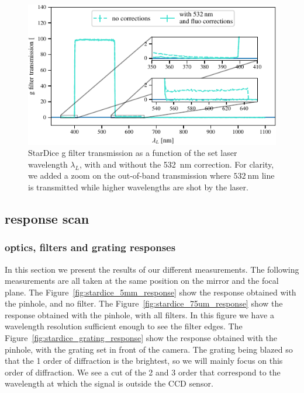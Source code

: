 \begin{figure}[h]
    \centering
    \includegraphics[width=\columnwidth]{fig/g_filter_532.pdf}
    \caption{StarDice g filter transmission as a function of the set laser wavelength $\lambda_L$, with and without the \SI{532}{\nm} correction. For clarity, we added a zoom on the out-of-band transmission where $\SI{532}{\nm}$ line is transmitted while higher wavelengths are shot by the laser.}
    \label{fig:g_filter_532}
\end{figure}

\subsection{\SD response scan}

\subsubsection{\SD optics, filters and grating responses}

In this section we present the results of our different measurements. The following measurements are all taken at the same position on the mirror and the focal plane. The Figure~\ref{fig:stardice_5mm_response} show the \SD response obtained with the \bpinhole pinhole, and no filter. The Figure~\ref{fig:stardice_75um_response} show the \SD response obtained with the \spinhole pinhole, with all filters. In this figure we have a wavelength resolution sufficient enough to see the filter edges. The Figure~\ref{fig:stardice_grating_response} show the \SD response obtained with the \spinhole pinhole, with the grating set in front of the camera. The grating being blazed so that the 1 order of diffraction is the brightest, so we will mainly focus on this order of diffraction. We see a cut of the 2 and 3 order that correspond to the wavelength at which the signal is outside the CCD sensor.

